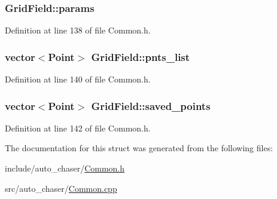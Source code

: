 \subsubsection[{\texorpdfstring{params}{params}}]{ Grid\+Field\+::params}\hypertarget{struct_grid_field_a735e3033049d10f084e74083ae44dd21}{}\label{struct_grid_field_a735e3033049d10f084e74083ae44dd21}


Definition at line 138 of file Common.\+h.

\subsubsection[{\texorpdfstring{pnts\+\_\+list}{pnts_list}}]{\setlength{\rightskip}{0pt plus 5cm}vector$<$Point$>$ Grid\+Field\+::pnts\+\_\+list}\hypertarget{struct_grid_field_a76901c3a463e8cbe456c8f73bc264380}{}\label{struct_grid_field_a76901c3a463e8cbe456c8f73bc264380}


Definition at line 140 of file Common.\+h.

\subsubsection[{\texorpdfstring{saved\+\_\+points}{saved_points}}]{\setlength{\rightskip}{0pt plus 5cm}vector$<$Point$>$ Grid\+Field\+::saved\+\_\+points}\hypertarget{struct_grid_field_ad5dc16fb46eef17df3a554f5b5604611}{}\label{struct_grid_field_ad5dc16fb46eef17df3a554f5b5604611}


Definition at line 142 of file Common.\+h.



The documentation for this struct was generated from the following files\+:\begin{DoxyCompactItemize}
\item 
include/auto\+\_\+chaser/\hyperlink{_common_8h}{Common.\+h}\item 
src/auto\+\_\+chaser/\hyperlink{_common_8cpp}{Common.\+cpp}\end{DoxyCompactItemize}
